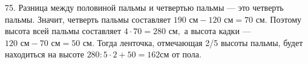 75. Разница между половиной пальмы и четвертью пальмы --- это четверть пальмы. Значит, четверть пальмы составляет $190\text{ см}-120\text{ см}=70\text{ см}.$
Поэтому высота всей пальмы составляет $4\cdot70=280\text{ см},$ а высота кадки --- $120\text{ см}-70\text{ см}=50\text{ см}.$ Тогда ленточка, отмечающая 2/5 высоты пальмы, будет находиться на высоте $280:5\cdot2+50=162$см от пола.\\
